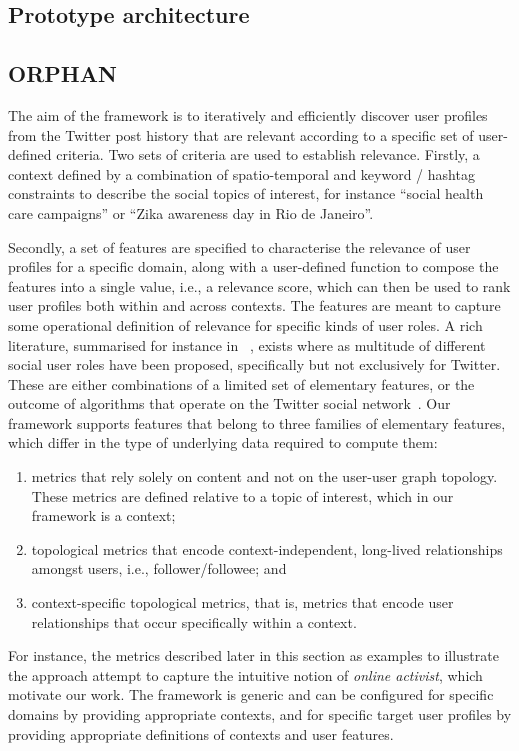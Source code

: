\documentclass[runningheads]{llncs}
\begin{document}
\subsection{Prototype architecture}	 




\subsection{ORPHAN}


The aim of the framework is to iteratively and efficiently discover user profiles from the Twitter post history that are relevant according to a specific set of user-defined criteria.
%
Two sets of criteria are used to establish relevance.
Firstly, a context defined by a combination of spatio-temporal and keyword / hashtag constraints to describe the social topics of interest, for instance ``social health care campaigns'' or ``Zika awareness day in Rio de Janeiro''.

Secondly, a set of features are specified to characterise the relevance of user profiles for a specific domain, along with a user-defined function to compose the features into a single value, i.e., a relevance score, which can then be used to rank user profiles both within and across contexts.
The features are meant to capture some operational definition of relevance for specific kinds of user roles. 
%
A rich literature, summarised for instance in ~\cite{RIQUELME2016949}, exists where as multitude of different social user roles have been proposed, specifically but not exclusively for Twitter.
These are either combinations of a limited set of elementary features, or the outcome of algorithms that operate on the Twitter social network~\cite{RIQUELME2016949}. 
Our framework supports features that belong to three families of elementary features, which differ in the type of underlying data required to compute them:
\begin{enumerate}
	\item metrics  that rely solely on content and not on the user-user graph topology. These metrics are defined relative to a topic of interest, which in our framework is a context;
	\item topological metrics that encode context-independent, long-lived relationships amongst users, i.e., follower/followee; and 
	\item context-specific topological metrics, that is, metrics that encode user relationships that occur specifically within a context.
\end{enumerate}
For instance, the metrics described later in this section as  examples to illustrate the approach attempt to capture the intuitive notion of \textit{online activist}, which motivate our work.
%
The framework is generic and can be configured for specific domains by providing appropriate contexts, and for specific target user profiles by providing appropriate definitions of contexts and user features.
\end{document}

